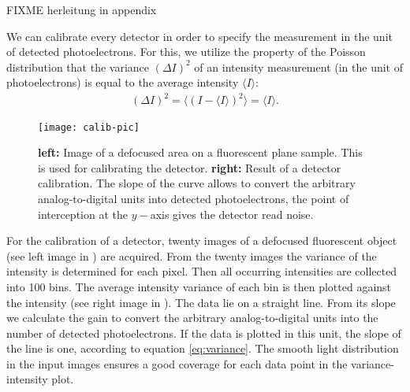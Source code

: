 FIXME herleitung in appendix



We can calibrate every detector in order to specify the measurement in
the unit of detected photoelectrons. For this, we utilize the property
of the Poisson distribution that the variance $(\Delta I)^2$ of an
intensity measurement (in the unit of photoelectrons) is equal to the
average intensity $\langle I\rangle$:
\begin{align}
\label{eq:variance}
  (\Delta I)^2 = \langle(I - \langle I \rangle) ^2\rangle = \langle I\rangle.
\end{align}
\newcommand{\comment}[2]{#2}
\begin{figure}
  \centering
  \texttt{[image: calib-pic]}
  \caption{{\bf left:} Image of a defocused area on a fluorescent
    plane sample. This is used for calibrating the detector. {\bf
      right:} Result of a detector calibration. The slope of the curve
    allows to convert the arbitrary analog-to-digital units into
    detected photoelectrons, the point of interception at the $y-$axis
    gives the detector read noise.}
  \label{fig:shot-noise}
\end{figure}
For the calibration of a detector, twenty images of a  defocused fluorescent object (see left image in
) are acquired. From the twenty images the
variance of the intensity is determined for each pixel. Then all
occurring intensities are collected into 100 bins. The average
intensity variance of each bin is then plotted against the intensity
(see right image in ). The data lie on a
straight line. From its slope we calculate the gain to convert the
arbitrary analog-to-digital units into the number of detected
photoelectrons. If the data is plotted in this unit, the slope of the
line is one, according to equation \eqref{eq:variance}. The smooth
light distribution in the input images ensures a good coverage for
each data point in the variance-intensity plot. 


